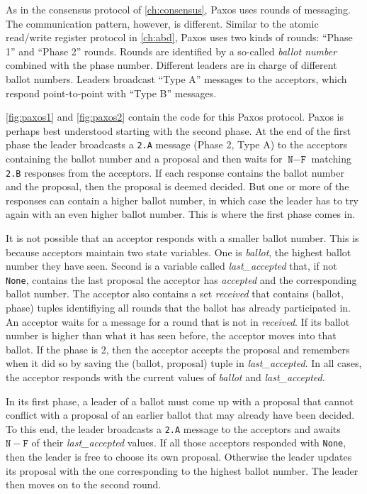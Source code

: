 \documentclass{report}
\begin{document}
As in the consensus protocol of \autoref{ch:consensus}, Paxos uses rounds of messaging.
The communication pattern, however, is different.
Similar to the atomic read/write register protocol in \autoref{ch:abd},
Paxos uses two kinds of rounds: ``Phase 1'' and ``Phase 2'' rounds.
Rounds are identified by a so-called
\emph{ballot number} combined with the phase number.
Different leaders are in charge of different ballot numbers.
Leaders broadcast ``Type A''
messages to the acceptors, which respond point-to-point with ``Type B''
messages.

\autoref{fig:paxos1} and \autoref{fig:paxos2} contain the code for
this Paxos protocol.  Paxos is perhaps best understood starting
with the second phase.  At the end of the first phase the leader
broadcasts a \texttt{2.A} message (Phase 2, Type A) to the acceptors
containing the ballot number and a proposal and then waits for
$\texttt{N} - \texttt{F}$ matching \texttt{2.B} responses from the
acceptors.  If each response contains the ballot number and the
proposal, then the proposal is deemed decided.  But one or more of
the responses can contain a higher ballot number, in which case the
leader has to try again with an even higher ballot number.  This is
where the first phase comes in.

It is not possible that an acceptor responds with a smaller ballot
number.  This is because acceptors maintain two state variables.
One is \textit{ballot}, the highest ballot number they have seen.
Second is a variable called \textit{last\_accepted} that, if not
\texttt{None}, contains the last proposal the acceptor has
\emph{accepted} and the corresponding ballot number.  The acceptor
also contains a set \emph{received} that contains (ballot, phase)
tuples identifiying all rounds that the ballot has already participated
in.  An acceptor waits for a message for a round that is not in
\emph{received}.  If its ballot number is higher than what it has
seen before, the acceptor moves into that ballot.  If the phase is
2, then the acceptor accepts the proposal and remembers when it did
so by saving the (ballot, proposal) tuple in \textit{last\_accepted}.
In all cases, the acceptor responds with the current values of
\textit{ballot} and \textit{last\_accepted}.

In its first phase, a leader of a ballot must come up with a proposal that
cannot conflict with a proposal of an earlier ballot that may already
have been decided.  To this end, the leader broadcasts a \texttt{2.A}
message to the acceptors and awaits $\mathtt{N} - \mathtt{F}$ of their
\textit{last\_accepted}
values.  If all those acceptors responded with \texttt{None}, then the leader
is free to choose its own proposal.  Otherwise the leader updates
its proposal with the one corresponding to the highest ballot number.
The leader then moves on to the second round.
\end{document}
